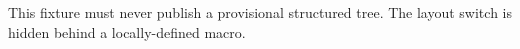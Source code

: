 \documentclass{article}
\newcommand\SwitchLedgerLayout{\twocolumn}
\begin{document}
This fixture must never publish a provisional structured tree.
\SwitchLedgerLayout
The layout switch is hidden behind a locally-defined macro.
\end{document}
